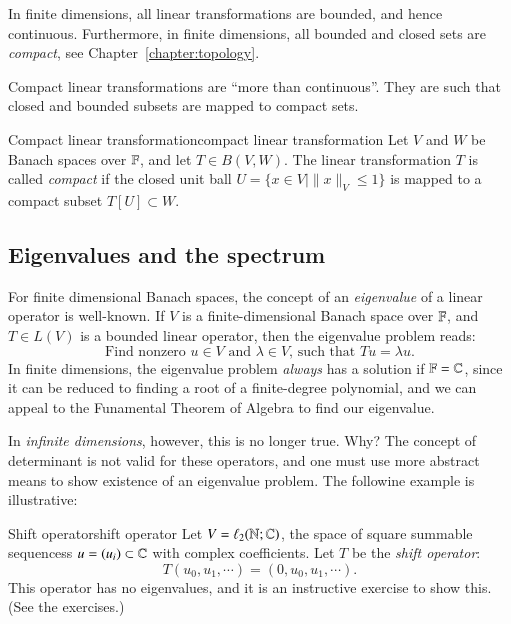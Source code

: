 In finite dimensions, all linear transformations are bounded, and hence continuous. Furthermore, in finite dimensions, all bounded and closed sets are \emph{compact}, see Chapter~\ref{chapter:topology}.

Compact linear transformations are ``more than continuous''. They are such that closed and bounded subsets are mapped to compact sets.

\begin{myDefinition}{Compact linear transformation}{compact linear transformation}
    Let $V$ and $W$ be Banach spaces over $\mathbb{F}$, and let $T \in B(V,W)$. The linear transformation $T$ is called \emph{compact} if the closed unit ball $U = \{ x\in V \mid \|x\|_V \leq 1\}$ is mapped to a compact subset $T[U]\subset W$.
\end{myDefinition}

\subsection{Eigenvalues and the spectrum}

For finite dimensional Banach spaces, the concept of an \emph{eigenvalue} of a linear operator is well-known. If $V$ is a finite-dimensional Banach space over $\mathbb{F}$, and $T \in L(V)$ is a bounded linear operator, then the eigenvalue problem reads:
\begin{equation}
    \text{Find nonzero $u\in V$ and $\lambda \in V$, such that $Tu = \lambda u$.}
\end{equation}
In finite dimensions, the eigenvalue problem \emph{always} has a solution if $\mathbb{F} = \mathbb{C}$, since it can be reduced to finding a root of a finite-degree polynomial, and we can appeal to the Funamental Theorem of Algebra to find our eigenvalue.

In \emph{infinite dimensions}, however, this is no longer true. Why? The concept of determinant is not valid for these operators, and one must use more abstract means to show existence of an eigenvalue problem. The followine example is illustrative:

\begin{myExample}{Shift operator}{shift operator}
    Let $V = \ell_2(\mathbb{N};\mathbb{C})$, the space of square summable sequencess $u = (u_i) \subset \mathbb{C}$ with complex coefficients. Let $T$ be the \emph{shift operator}:
    $$ T(u_0,u_1,\cdots) = (0, u_0, u_1, \cdots). $$
    This operator has no eigenvalues, and it is an instructive exercise to show this. (See the exercises.)
\end{myExample}

